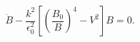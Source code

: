 \begin{equation}
\ddot B - \frac{k^2}{\epsilon_{0}^2}\left[
   \left(\frac{B_0}{B}\right)^4 - V^2 \right] B = 0. 
\label{Beq}
\end{equation}

